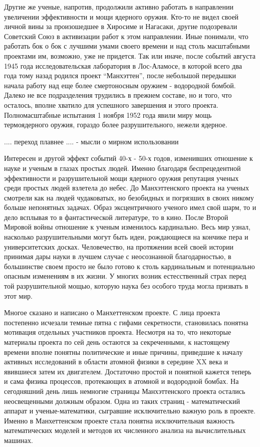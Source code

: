 Другие же ученые, напротив, продолжили активно работать в направлении увеличении эффективности и мощи ядерного оружия.
Кто-то не видел своей личной вины за произошедшее в Хиросиме и Нагасаки, другие подозревали Советский Союз в активизации работ к этом направлении.
Иные понимали, что работать бок о бок с лучшими умами своего времени и над столь масштабными проектами им, возможно, уже не придется. 
Так или иначе, после событий августа 1945 года исследовательская лаборатория в Лос-Аламосе, в которой всего два года тому назад родился проект ``Манхэттен'', после небольшой передышки начала работу над еще более смертоносным оружием - водородной бомбой.
Далеко не все подразделения трудились в прежнем составе, но и того, что осталось, вполне хватило для успешного завершения и этого проекта. 
Полномасштабные испытания 1 ноября 1952 года явили миру мощь термоядерного оружия, гораздо более разрушительного, нежели ядерное.


.... переход плавнее .... - мысли о мирном использовании 


Интересен и другой эффект событий 40-х - 50-х годов, изменивших отношение к науке и ученым в глазах простых людей.
Именно благодаря беспрецедентной эффективности и разрушительной мощи ядерного оружия репутация ученых среди простых людей взлетела до небес. 
До Манхэттенского проекта на ученых смотрели как на людей чудаковатых, но безобидных и погрязших в своих никому больше непонятных задачах. 
Образ эксцентричного ученого имел свой шарм, то и дело всплывая то в фантастической литературе, то в кино.
После Второй Мировой войны отношение к ученым изменилось кардинально.
Весь мир узнал, насколько разрушительными могут быть идеи, рождающиеся на кончике пера и университетских досках.
Человечество, на протяжении всей своей истории принимая дары науки в лучшем случае с неосознанной благодарностью, в большинстве своем просто не было готово к столь кардинальным и потенциально опасным изменениям в их жизни.
У многих возник естесственный страх перед той разрушительной мощью, которую наука без особого труда могла призвать в этот мир. 

Многое сказано и написано о Манхеттенском проекте.
С лица проекта постепенно исчезали темные пятна с гифами секретности, становилась понятна мотивация отдельных участников проекта.
Несмотря на то, что некоторые материалы проекта по сей день остаются за секреченными, к настоящему времени вполне понятны политические и иные причины, приведшие к началу активных исследований в области атомной физики в середине XX века и явившиеся затем их двигателем.
Достаточно простой и понятной кажется теперь и сама физика процессов, протекающих в атомной и водородной бомбах.
На сегодняшний день лишь немногие страницы Манхэттенского проекта остались неосвещенными должным образом. 
Одна из таких страниц - математический аппарат и ученые-математики, сыгравшие исключительно важную роль в проекте.
Именно в Манхеттенском проекте стала понятна исключительная важность математических моделей и методов их численного анализа на вычислительных машинах.

